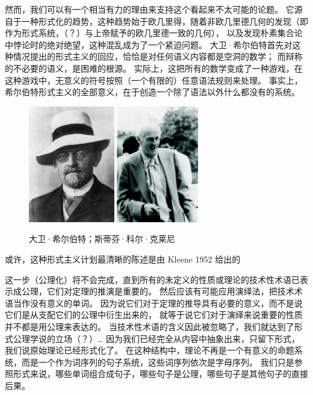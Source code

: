 \documentclass[a4paper,12pt]{article}
\begin{document}
然而，我们可以有一个相当有力的理由来支持这个看起来不太可能的论题。
它源自于一种形式化的趋势，这种趋势始于欧几里得，随着非欧几里德几何的发现（即作为形式系统，（？）与上帝赋予的欧几里德一致的几何），
以及发现朴素集合论中悖论时的绝对绝望，这种混乱成为了一个紧迫问题。
大卫·希尔伯特首先对这种情况提出的形式主义的回应，恰恰是对任何语义内容都是空洞的数学； 而辩称的不必要的语义，是困难的根源。
实际上，这把所有的数学变成了一种游戏，在这种游戏中，无意义的符号按照（一个有限的）任意语法规则来处理。
事实上，希尔伯特形式主义的全部意义，在于创造一个除了语法以外什么都没有的系统。

\begin{figure}[ht]
\centering
\includegraphics[height=2.0in]{images/hilbert.jpg}
\includegraphics[height=2.0in]{images/kleene.jpg}
\caption{大卫·希尔伯特；斯蒂芬·科尔·克莱尼}
\end{figure}

或许，这种形式主义计划最清晰的陈述是由 Kleene 1952 给出的

\begin{displayquote}
这一步（公理化）将不会完成，直到所有的未定义的性质或理论的技术性术语已表示成公理，它们对定理的推演是重要的。
然后应该有可能应用演绎法，把技术术语当作没有意义的单词。
因为说它们对于定理的推导具有必要的意义，而不是说它们是从支配它们的公理中衍生出来的，
就等于说它们对于演绎来说重要的性质并不都是用公理来表达的。
当技术性术语的含义因此被忽略了，我们就达到了形式公理学说的立场（？）\ldots
因为我们已经完全从内容中抽象出来，只留下形式，我们说原始理论已经形式化了。
在这种结构中，理论不再是一个有意义的命题系统，而是一个作为词序列的句子系统，这些词序列依次是字母序列。
我们只是参照形式来说，哪些单词组合成句子，哪些句子是公理，哪些句子是其他句子的直接后果。
\end{displayquote}
\end{document}
